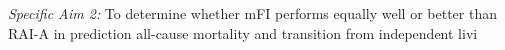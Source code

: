 \emph{Specific Aim 2:} To determine whether mFI performs equally well or better than RAI-A in prediction all-cause mortality and transition from independent livi